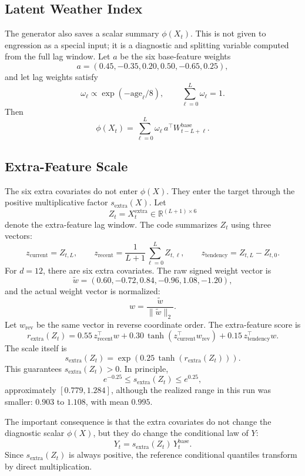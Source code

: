 \documentclass[11pt]{article}
\begin{document}
\subsection{Latent Weather Index}

The generator also saves a scalar summary \(\phi(X_t)\).  This is not given to
engression as a special input; it is a diagnostic and splitting variable
computed from the full lag window.  Let \(a\) be the six base-feature weights
\[
  a = (0.45,-0.35,0.20,0.50,-0.65,0.25),
\]
and let lag weights satisfy
\[
  \omega_\ell \propto \exp(-\mathrm{age}_\ell/8),
  \qquad \sum_{\ell=0}^{L} \omega_\ell = 1.
\]
Then
\[
  \phi(X_t)
  =
  \sum_{\ell=0}^{L}
  \omega_\ell\, a^\top W^{\mathrm{base}}_{t-L+\ell}.
\]

\subsection{Extra-Feature Scale}

The six extra covariates do not enter \(\phi(X)\).  They enter the target
through the positive multiplicative factor \(s_{\mathrm{extra}}(X)\).  Let
\[
  Z_t = X^{\mathrm{extra}}_t \in \mathbb{R}^{(L+1)\times 6}
\]
denote the extra-feature lag window.  The code summarizes \(Z_t\) using three
vectors:
\[
  z_{\mathrm{current}} = Z_{t,L},
  \qquad
  z_{\mathrm{recent}} = \frac{1}{L+1}\sum_{\ell=0}^{L} Z_{t,\ell},
  \qquad
  z_{\mathrm{tendency}} = Z_{t,L} - Z_{t,0}.
\]
For \(d=12\), there are six extra covariates.  The raw signed weight vector is
\[
  \widetilde{w}
  =
  (0.60,-0.72,0.84,-0.96,1.08,-1.20),
\]
and the actual weight vector is normalized:
\[
  w = \frac{\widetilde{w}}{\lVert \widetilde{w}\rVert_2}.
\]
Let \(w_{\mathrm{rev}}\) be the same vector in reverse coordinate order.  The
extra-feature score is
\[
  r_{\mathrm{extra}}(Z_t)
  =
  0.55\,z_{\mathrm{recent}}^\top w
  +0.30\,\tanh\!\left(z_{\mathrm{current}}^\top w_{\mathrm{rev}}\right)
  +0.15\,z_{\mathrm{tendency}}^\top w.
\]
The scale itself is
\[
  s_{\mathrm{extra}}(Z_t)
  =
  \exp\!\left(0.25\,\tanh(r_{\mathrm{extra}}(Z_t))\right).
\]
This guarantees \(s_{\mathrm{extra}}(Z_t)>0\).  In principle,
\[
  e^{-0.25}
  \le
  s_{\mathrm{extra}}(Z_t)
  \le
  e^{0.25},
\]
approximately \([0.779,1.284]\), although the realized range in this run was
smaller: \(0.903\) to \(1.108\), with mean \(0.995\).

The important consequence is that the extra covariates do not change the
diagnostic scalar \(\phi(X)\), but they do change the conditional law of \(Y\):
\[
  Y_t
  =
  s_{\mathrm{extra}}(Z_t)\,Y_t^{\mathrm{base}}.
\]
Since \(s_{\mathrm{extra}}(Z_t)\) is always positive, the reference conditional
quantiles transform by direct multiplication.
\end{document}
